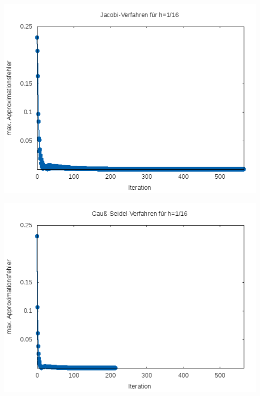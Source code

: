 \documentclass{article}
\begin{document}
\begin{center}
\includegraphics[scale=0.8]{bilder/fehler_jacobi_1_16.png}
\end{center}

\begin{center}
\includegraphics[scale=0.8]{bilder/fehler_gs_1_16.png}
\end{center}
\end{document}
